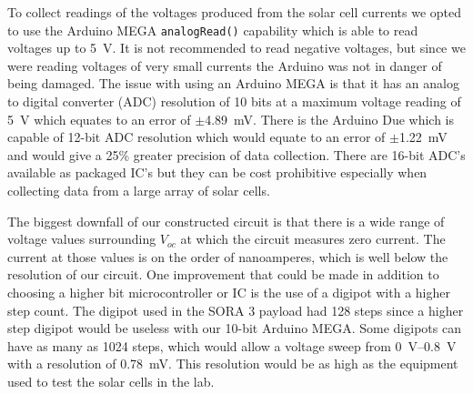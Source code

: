 To collect readings of the voltages produced from the solar cell currents we opted to use the Arduino MEGA \texttt{analogRead()} capability which is able to read voltages up to \SI{5}{\volt}.
It is not recommended to read negative voltages, but since we were reading voltages of very small currents the Arduino was not in danger of being damaged.
The issue with using an Arduino MEGA is that it has an analog to digital converter (ADC) resolution of 10 bits at a maximum voltage reading of \SI{5}{\volt} which equates to an error of $\pm$\SI{4.89}{\milli\volt}.
There is the Arduino Due which is capable of 12-bit ADC resolution which would equate to an error of $\pm$\SI{1.22}{\milli\volt} and would give a 25\% greater precision of data collection.
There are 16-bit ADC's available as packaged IC's but they can be cost prohibitive especially when collecting data from a large array of solar cells.

The biggest downfall of our constructed circuit is that there is a wide range of voltage values surrounding $V_{oc}$ at which the circuit measures zero current.
The current at those values is on the order of nanoamperes, which is well below the resolution of our circuit.
One improvement that could be made in addition to choosing a higher bit microcontroller or IC is the use of a digipot with a higher step count.
The digipot used in the SORA 3 payload had 128 steps since a higher step digipot would be useless with our 10-bit Arduino MEGA.
Some digipots can have as many as 1024 steps, which would allow a voltage sweep from \SIrange{0}{0.8}{\volt} with a resolution of \SI{0.78}{\milli\volt}.
This resolution would be as high as the equipment used to test the solar cells in the lab.
